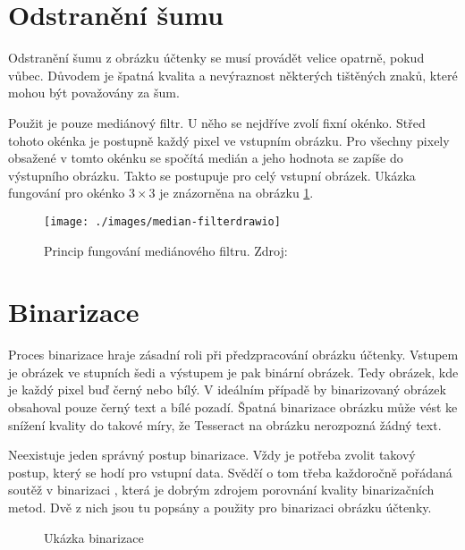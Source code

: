 \documentclass[thesis=B,czech]{FITthesis}[2019/12/23]
\begin{document}
\section{Odstranění šumu}
Odstranění šumu z obrázku účtenky se musí provádět velice opatrně, pokud vůbec. Důvodem je špatná kvalita a nevýraznost některých tištěných znaků, které mohou být považovány za šum.

Použit je pouze mediánový filtr. U něho se nejdříve zvolí fixní okénko. Střed tohoto okénka je postupně každý pixel ve vstupním obrázku. Pro všechny pixely obsažené v tomto okénku se spočítá medián a jeho hodnota se zapíše do výstupního obrázku. Takto se postupuje pro celý vstupní obrázek. Ukázka fungování pro okénko $3 \times 3$ je znázorněna na obrázku \ref{fig:median-filtering}.

\begin{figure}[!hb]\centering
	\texttt{[image: ./images/median-filterdrawio]}
	\caption[Mediánový filtr]{Princip fungování mediánového filtru. Zdroj: \cite[překresleno]{MedianFiltering2005}}\label{fig:median-filtering}
\end{figure}

\section{Binarizace}
Proces binarizace hraje zásadní roli při předzpracování obrázku účtenky. Vstupem je obrázek ve stupních šedi a výstupem je pak binární obrázek. Tedy obrázek, kde je každý pixel buď černý nebo bílý. V ideálním případě by binarizovaný obrázek obsahoval pouze černý text a bílé pozadí. Špatná binarizace obrázku může vést ke snížení kvality do takové míry, že Tesseract na obrázku nerozpozná žádný text.

Neexistuje jeden správný postup binarizace. Vždy je potřeba zvolit takový postup, který se hodí pro vstupní data. Svědčí o tom třeba každoročně pořádaná soutěž v binarizaci  \cite{Pratikakis2019}, která je dobrým zdrojem porovnání kvality binarizačních metod. Dvě z nich jsou tu popsány a použity pro binarizaci obrázku účtenky.


\begin{figure}[!b]%
	\centering
	\caption{Ukázka binarizace}%
	\label{fig:kroky-predzpracovani}%
\end{figure}
\end{document}
